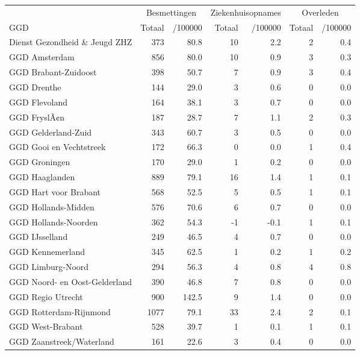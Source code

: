 \documentclass[
  english,
  man,floatsintext]{apa6}
\begin{document}
\begin{table}
\centering\begingroup\fontsize{10}{12}\selectfont

\begin{threeparttable}
\begin{tabular}{lrrrrrr}
\toprule
\multicolumn{1}{c}{ } & \multicolumn{2}{c}{Besmettingen} & \multicolumn{2}{c}{Ziekenhuisopnames} & \multicolumn{2}{c}{Overleden} \\
\cmidrule(l{3pt}r{3pt}){2-3} \cmidrule(l{3pt}r{3pt}){4-5} \cmidrule(l{3pt}r{3pt}){6-7}
GGD & Totaal & /100000 & Totaal & /100000 & Totaal & /100000\\
\midrule
Dienst Gezondheid \& Jeugd ZHZ & 373 & 80.8 & 10 & 2.2 & 2 & 0.4\\
GGD Amsterdam & 856 & 80.0 & 10 & 0.9 & 3 & 0.3\\
GGD Brabant-Zuidoost & 398 & 50.7 & 7 & 0.9 & 3 & 0.4\\
GGD Drenthe & 144 & 29.0 & 3 & 0.6 & 0 & 0.0\\
GGD Flevoland & 164 & 38.1 & 3 & 0.7 & 0 & 0.0\\
GGD FryslÃ¢n & 187 & 28.7 & 7 & 1.1 & 2 & 0.3\\
GGD Gelderland-Zuid & 343 & 60.7 & 3 & 0.5 & 0 & 0.0\\
GGD Gooi en Vechtstreek & 172 & 66.3 & 0 & 0.0 & 1 & 0.4\\
GGD Groningen & 170 & 29.0 & 1 & 0.2 & 0 & 0.0\\
GGD Haaglanden & 889 & 79.1 & 16 & 1.4 & 1 & 0.1\\
GGD Hart voor Brabant & 568 & 52.5 & 5 & 0.5 & 1 & 0.1\\
GGD Hollands-Midden & 576 & 70.6 & 6 & 0.7 & 0 & 0.0\\
GGD Hollands-Noorden & 362 & 54.3 & -1 & -0.1 & 1 & 0.1\\
GGD IJsselland & 249 & 46.5 & 4 & 0.7 & 0 & 0.0\\
GGD Kennemerland & 345 & 62.5 & 1 & 0.2 & 1 & 0.2\\
GGD Limburg-Noord & 294 & 56.3 & 4 & 0.8 & 4 & 0.8\\
GGD Noord- en Oost-Gelderland & 390 & 46.8 & 7 & 0.8 & 0 & 0.0\\
GGD Regio Utrecht & 900 & 142.5 & 9 & 1.4 & 0 & 0.0\\
GGD Rotterdam-Rijnmond & 1077 & 79.1 & 33 & 2.4 & 2 & 0.1\\
GGD West-Brabant & 528 & 39.7 & 1 & 0.1 & 1 & 0.1\\
GGD Zaanstreek/Waterland & 161 & 22.6 & 3 & 0.4 & 0 & 0.0\\

\end{tabular}
\end{threeparttable}
\end{table}
\end{document}
